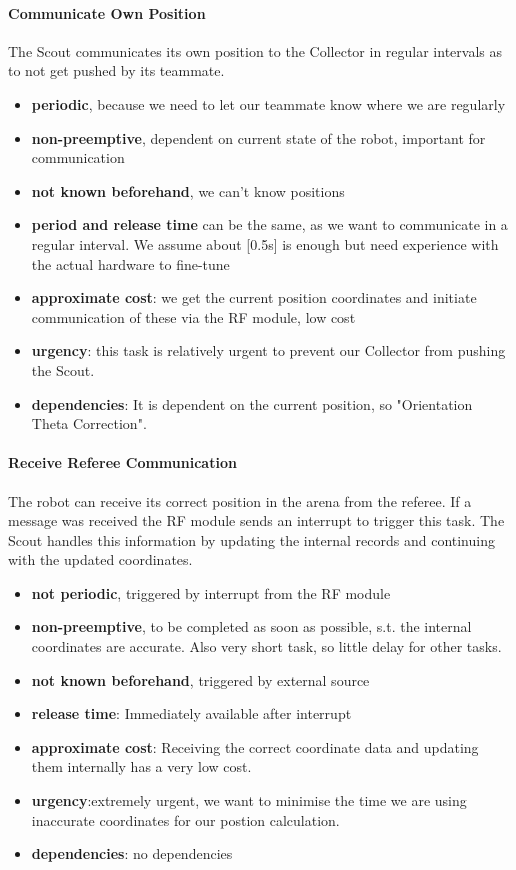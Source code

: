 \documentclass[12pt]{article}
\begin{document}
\paragraph{Communicate Own Position}
The Scout communicates its own position to the Collector in regular intervals as to not get pushed by its teammate. 
\begin{itemize}
	\item \textbf{periodic}, because we need to let our teammate know where we are regularly
	\item \textbf{non-preemptive}, dependent on current state of the robot, important for communication
	\item \textbf{not known beforehand}, we can't know positions
	\item \textbf{period and release time} can be the same, as we want to communicate in a regular interval. We assume about [0.5s] is enough but need experience with the actual hardware to fine-tune
	\item \textbf{approximate cost}: we get the current position coordinates and initiate communication of these via the RF module, low cost
	\item \textbf{urgency}: this task is relatively urgent to prevent our Collector from pushing the Scout.
	\item \textbf{dependencies}: It is dependent on the current position, so "Orientation Theta Correction".
\end{itemize}

\paragraph{Receive Referee Communication}
The robot can receive its correct position in the arena from the referee. If a message was received the RF module sends an interrupt to trigger this task. The Scout handles this information by updating the internal records and continuing with the updated coordinates.
\begin{itemize}
	\item \textbf{not periodic}, triggered by interrupt from the RF module
	\item \textbf{non-preemptive}, to be completed as soon as possible, s.t. the internal coordinates are accurate. Also very short task, so little delay for other tasks.
	\item \textbf{not known beforehand}, triggered by external source
	\item \textbf{release time}: Immediately available after interrupt
	\item \textbf{approximate cost}: Receiving the correct coordinate data and updating them internally has a very low cost.
	\item \textbf{urgency}:extremely urgent, we want to minimise the time we are using inaccurate coordinates for our postion calculation.
	\item \textbf{dependencies}: no dependencies
\end{itemize}
\end{document}
